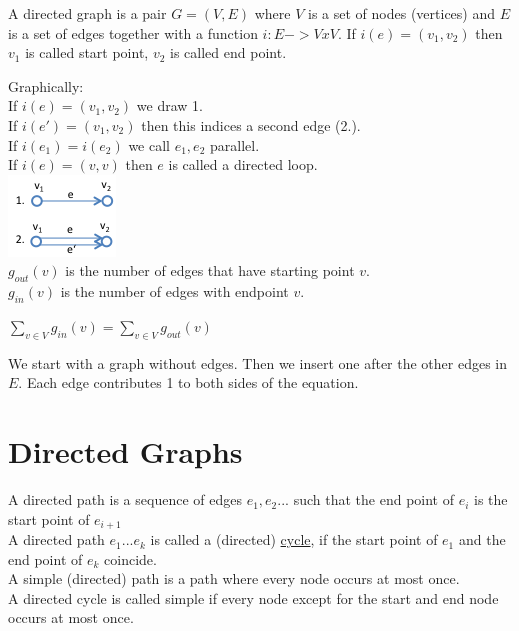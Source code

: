 \begin{definition}
    A directed graph is a pair $G = (V,E)$ where $V$ is a set of nodes (vertices) and $E$ is a set of edges together 
    with a function $i: E -> V x V$. If $i(e) = (v_{1},v_{2})$ then $v_{1}$ is called start point, $v_{2}$ is called end point.
\end{definition}
Graphically: \\[3mm]
If $i(e) = (v_{1},v_{2})$ we draw 1. \\
If $i(e') = (v_{1},v_{2})$ then this indices a second edge (2.). \\
If $i(e_{1}) = i(e_{2})$ we call $e_{1},e_{2}$ parallel. \\
If $i(e) = (v,v)$ then $e$ is called a directed loop. \\
\includegraphics{diagrams/def15_directd_graph.png} \\
$g_{out}(v)$ is the number of edges that have starting point $v$. \\
$g_{in}(v)$ is the number of edges with endpoint $v$.

\begin{lemma}
    $\displaystyle\sum\limits_{v \in V} g_{in}(v) = \displaystyle\sum\limits_{v \in V} g_{out}(v)$
\end{lemma}

\begin{prooof}
    We start with a graph without edges. Then we insert one after the other edges in $E$. 
    Each edge contributes 1 to both sides of the equation.
\end{prooof}

\section{Directed Graphs}
\begin{definition}
    A directed path is a sequence of edges $e_{1},e_{2}...$ such that the end point of $e_{i}$ is the start point of
    $e_{i+1}$\\[3mm]

    A directed path $e_{1}...e_{k}$ is called a (directed) \underline{cycle}, if the start point of $e_{1}$ and
    the end point of $e_{k}$ coincide. \\
    A simple (directed) path is a path where every node occurs at most once. \\
    A directed cycle is called simple if every node except for the start and end node occurs at most once.
\end{definition}

